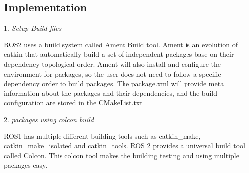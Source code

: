 \documentclass[letterpaper, 10 pt, conference]{ieeeconf}  %
\begin{document}
\subsection{Implementation}

1. \textit{Setup Build files} \par \vspace{5pt}
 ROS2 uses a build system called Ament Build tool. Ament is an evolution of catkin that automatically build a set of independent packages base on their dependency topological order. Ament will also install and configure the environment for packages, so the user does not need to follow a specific dependency order to build packages. The package.xml will provide meta information about the packages and their dependencies, and the build configuration are stored in the CMakeList.txt  \par \vspace{5pt}
 
2. \textit{packages using colcon build}\par\vspace{5pt}
ROS1 has multiple different building tools such as catkin\_make, catkin\_make\_isolated and catkin\_tools. ROS 2 provides a universal build tool called Colcon. This colcon tool makes the building testing and using multiple packages easy. \par\vspace{5pt}
\end{document}
